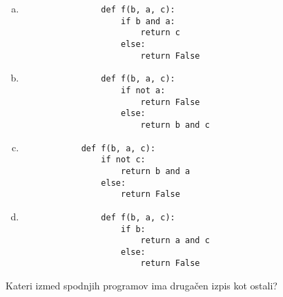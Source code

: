 \documentclass[arhiv, 10pt]{../izpit}
\begin{document}
        \begin{multicols}{2}
        \begin{enumerate}[(a)]
\item 
                \begin{verbatim}
                def f(b, a, c):
                    if b and a:
                        return c
                    else:
                        return False
                \end{verbatim}
            
\item 
                \begin{verbatim}
                def f(b, a, c):
                    if not a:
                        return False
                    else:
                        return b and c
                \end{verbatim}
            
\item 
            \begin{verbatim}
            def f(b, a, c):
                if not c:
                    return b and a
                else:
                    return False
            \end{verbatim}
        
\item 
                \begin{verbatim}
                def f(b, a, c):
                    if b:
                        return a and c
                    else:
                        return False
                \end{verbatim}
            
\end{enumerate}

        \end{multicols}
    
        \naloga*
        
        Kateri izmed spodnjih programov ima drugačen izpis kot ostali?
    
\end{document}
